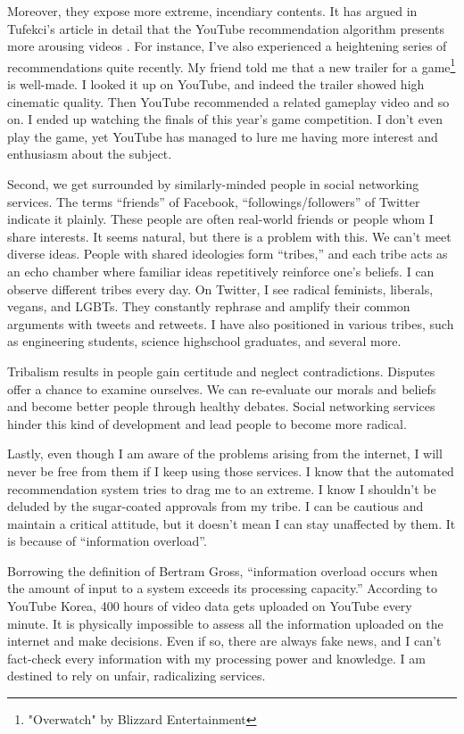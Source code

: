 \documentclass[10pt,a4paper]{article}
\begin{document}
	Moreover, they expose more extreme, incendiary contents. It has argued in Tufekci's article in detail that the YouTube recommendation algorithm presents more arousing videos \cite{tufecki}. For instance, I've also experienced a heightening series of recommendations quite recently. My friend told me that a new trailer for a game\footnote{"Overwatch" by Blizzard Entertainment} is well-made. I looked it up on YouTube, and indeed the trailer showed high cinematic quality. Then YouTube recommended a related gameplay video and so on. I ended up watching the finals of this year's game competition. I don't even play the game, yet YouTube has managed to lure me having more interest and enthusiasm about the subject. 
	
	Second, we get surrounded by similarly-minded people in social networking services. The terms ``friends'' of Facebook, ``followings/followers'' of Twitter indicate it plainly. These people are often real-world friends or people whom I share interests. It seems natural, but there is a problem with this. We can't meet diverse ideas. People with shared ideologies form ``tribes,'' and each tribe acts as an echo chamber where familiar ideas repetitively reinforce one's beliefs. I can observe different tribes every day. On Twitter, I see radical feminists, liberals, vegans, and LGBTs. They constantly rephrase and amplify their common arguments with tweets and retweets. I have also positioned in various tribes, such as engineering students, science highschool graduates, and several more.
	
	Tribalism results in people gain certitude and neglect contradictions. Disputes offer a chance to examine ourselves. We can re-evaluate our morals and beliefs and become better people through healthy debates. Social networking services hinder this kind of development and lead people to become more radical. 
	
	Lastly, even though I am aware of the problems arising from the internet, I will never be free from them if I keep using those services. I know that the automated recommendation system tries to drag me to an extreme. I know I shouldn't be deluded by the sugar-coated approvals from my tribe. I can be cautious and maintain a critical attitude, but it doesn't mean I can stay unaffected by them. It is because of ``information overload\cite{gross}''.
	
	Borrowing the definition of Bertram Gross, ``information overload occurs when the amount of input to a system exceeds its processing capacity.'' According to YouTube Korea, 400 hours of video data gets uploaded on YouTube every minute\cite{usage}. It is physically impossible to assess all the information uploaded on the internet and make decisions. Even if so, there are always fake news, and I can't fact-check every information with my processing power and knowledge. I am destined to rely on unfair, radicalizing services.
	
\end{document}
